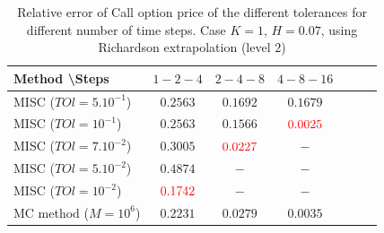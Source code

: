 \documentclass[11pt]{article}
\begin{document}
\begin{table}[h!]
	\centering
	\begin{tabular}{l*{5}{c}r}
		Method \textbackslash  Steps &$1-2-4$             & $2-4-8$ & $4-8-16$   \\
		\hline
		MISC ($TOl=5.10^{-1}$)  &$0.2563$ & $ 0.1692$ & $ 0.1679
		$   \\
		MISC ($TOl=10^{-1}$)  &$0.2563$ &  $0.1566$ & ${\color{red}  0.0025}$  \\
		MISC ($TOl=7.10^{-2}$) &$  0.3005$ &  $  {\color{red}0.0227}$ & $-$    \\
		MISC ($TOl=5.10^{-2}$) &$0.4874$ &  $  -$ & $-$    \\
		MISC ($TOl=10^{-2}$)&$ {\color{red}0.1742}$ &  $-$ & $-$  \\	
		MC method ($M=10^{6}$)  &$\mathbf{0.2231}$  & $  \mathbf{0.0279}$  & $\mathbf{0.0035}$ \\
		\hline	
		
	\end{tabular}
	\caption{Relative error of Call option price of the different tolerances for different number of time steps. Case $K=1$, $H=0.07$, using Richardson extrapolation (level $2$)}
	\label{Relative error of Call option price of the different tolerances for different number of time steps. Case $K=1, H=0.07$ , using Richardson extrapolation_level2}
\end{table}








%
\end{document}
